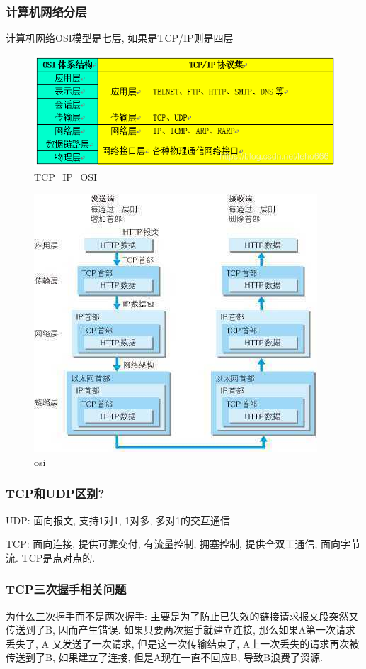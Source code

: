 \subsubsection{计算机网络分层}
计算机网络OSI模型是七层, 如果是TCP/IP则是四层
\begin{figure}
	\centering
	\includegraphics[width=0.7\linewidth]{figures/TCP_IP_OSI.png}
	\caption{TCP\_IP\_OSI}
	\label{fig:TCP_IP_OSI}
\end{figure}
\begin{figure}
	\centering
	\includegraphics[width=0.7\linewidth]{figures/osi.jpg}
	\caption{osi}
	\label{fig:osi}
\end{figure}
\subsubsection{TCP和UDP区别?}
\par
UDP: 面向报文, 支持1对1, 1对多, 多对1的交互通信
\par
TCP: 面向连接, 提供可靠交付, 有流量控制, 拥塞控制, 提供全双工通信, 面向字节流. TCP是点对点的.
\subsubsection{TCP三次握手相关问题}
为什么三次握手而不是两次握手: 主要是为了防止已失效的链接请求报文段突然又传送到了B, 因而产生错误. 如果只要两次握手就建立连接, 那么如果A第一次请求丢失了, A 又发送了一次请求, 但是这一次传输结束了, A上一次丢失的请求再次被传送到了B, 如果建立了连接, 但是A现在一直不回应B, 导致B浪费了资源.
